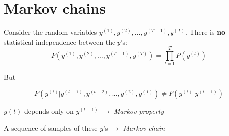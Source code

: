 \section{Markov chains}

\begin{frame} 
\end{frame}

\begin{frame}{\secname}

Consider the random variables $y^{(1)}, y^{(2)}, \ldots, y^{(T-1)}, y^{(T)}$.
There is \textbf{no} statistical independence between the $y$'s:
\begin{equation}
P(y^{(1)}, y^{(2)}, \ldots, y^{(T-1)}, y^{(T)}) = \prod_{t=1}^T P(y^{(t)})
\end{equation}

But

\begin{equation}
P(y^{(t)} | y^{(t-1)}, y^{(t-2)}, \ldots, y^{(2)}, y^{(1)}) \ne P(y^{(t)} | y^{(t-1)})
\end{equation}

$y{(t)}$ depends only on $y^{(t-1)}$ $\rightarrow$ \emph{Markov property}

A sequence of samples of these $y$'s $\rightarrow$ \emph{Markov chain}

\end{frame}
